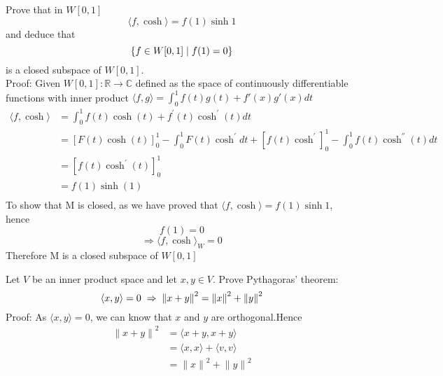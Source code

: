 \documentclass [12pt,letterpaper]{exam}
\begin{document}
\begin{questions}
\question %
Prove that in $W[0,1]$
$$
\langle f, \cosh\rangle = f(1)\sinh 1
$$
and deduce that
$$
\{ f\in W[0,1]\thickspace | \thickspace f(1)=0\}
$$
is a closed subspace of $W[0,1]$.\\

Proof: Given $W[0,1]: \mathbb{R} \rightarrow \mathbb{C}$ defined as the space of continuously differentiable functions with inner product $\langle f,g\rangle = \int_{0}^{1} f(t)g(t)+f'(x)g'(x) dt$
\begin{equation}
\begin{split}
\langle f, \cosh\rangle & = \int_{0}^{1} f(t) \cosh(t) + f^{'}(t) \cosh^{'}(t)dt\\
& = [F(t)\cosh(t)]_{0}^{1} - \int_{0}^{1} F(t)\cosh^{'}dt + [f(t)\cosh^{'}]_{0}^{1} - \int_{0}^{1}f(t)\cosh^{''}(t)dt\\
& = [f(t)\cosh^{'}(t)]_{0}^{1}\\
& = f(1)\sinh(1)\\
\end{split}
\end{equation}
To show that M is closed, as we have proved that $\langle f, \cosh\rangle = f(1)\sinh 1$, hence $$f(1) = 0$$
$$\Rightarrow {\langle f, \cosh\rangle}_W = 0$$
Therefore M is a closed subspace of $W[0,1]$

\question %
Let $V$ be an inner product space and let $x,y\in V$. Prove Pythagoras' theorem:
$$
\langle x,y\rangle = 0 \thickspace\Rightarrow\thickspace {\lVert x+y\rVert}^2 = {\lVert x\rVert}^2+{\lVert y\rVert}^2
$$
Proof: As $\langle x,y\rangle = 0$, we can know that $x$ and $y$ are orthogonal.Hence\\
\begin{equation}
\begin{split}
{\lVert x + y\rVert}^2 & = \langle x + y, x + y \rangle\\
& = \langle x,x \rangle + \langle v,v\rangle\\
& = {\lVert x \rVert}^2 + {\lVert y \rVert}^2\\
\end{split}
\end{equation}



\end{questions}
\end{document}

